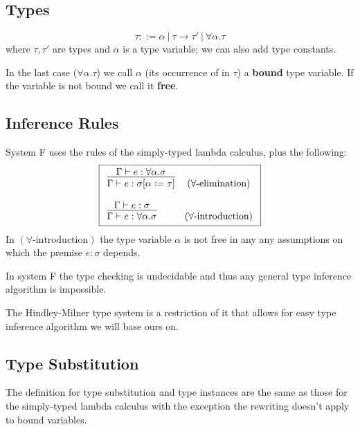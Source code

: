 \subsection{Types}

\begin{defn}[Type]
    $$\tau ::= \alpha\ |\ \tau \rightarrow \tau'\ |\ \forall \alpha . \tau$$
    where $\tau, \tau'$ are types and $\alpha$ is a type variable; we can also add type constants.
\end{defn}

In the last case ($\forall \alpha . \tau$) we call $\alpha$ (its occurrence of in $\tau$) a \textbf{bound} type variable. If the variable is not bound we call it \textbf{free}.

\subsection{Inference Rules}

\begin{defn}
    System F uses the rules of the simply-typed lambda calculus, plus the following:
    $$\boxed{\begin{array}{l c}
        \infer{\Gamma \vdash e : \sigma [\alpha := \tau]}{\Gamma \vdash e : \forall \alpha . \sigma} & (\text{$\forall$-elimination})\\\\
        \infer{\Gamma \vdash e : \forall \alpha . \sigma}{\Gamma \vdash e : \sigma} & (\text{$\forall$-introduction})
    \end{array}}$$
    In $(\text{$\forall$-introduction})$ the type variable $\alpha$ is not free in any any assumptions on which the premise $e : \sigma$ depends.
\end{defn}

In system F the type checking is undecidable and thus any general type inference algorithm is impossible.

The Hindley-Milner type system is a restriction of it that allows for easy type inference algorithm we will base ours on.

\subsection{Type Substitution}

The definition for type substitution and type instances are the same as those for the simply-typed lambda calculus with the exception the rewriting doesn't apply to bound variables.


